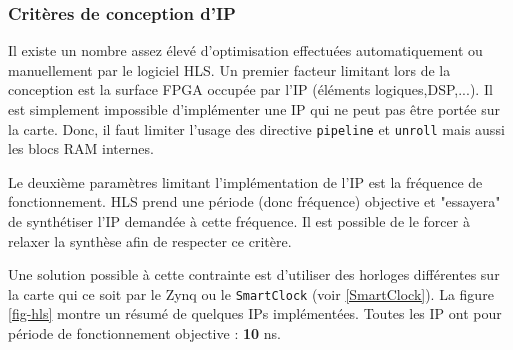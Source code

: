 \documentclass[12pt,a4paper]{article}
\begin{document}
\subsubsection{Critères de conception d'IP}
Il existe un nombre assez élevé d'optimisation effectuées automatiquement ou manuellement par le logiciel HLS. Un premier facteur limitant lors de la conception est la surface FPGA occupée par l'IP (éléments logiques,DSP,...). Il est simplement impossible d'implémenter une IP qui ne peut pas être portée sur la carte. Donc, il faut limiter l'usage des directive \texttt{pipeline} et \texttt{unroll} mais aussi les blocs RAM internes.

Le deuxième paramètres limitant l'implémentation de l'IP est la fréquence de fonctionnement. HLS prend une période (donc fréquence) objective et "essayera" de synthétiser l'IP demandée à cette fréquence. Il est possible de le forcer à relaxer la synthèse afin de respecter ce critère.

Une solution possible à cette contrainte est d'utiliser des horloges différentes sur la carte qui ce soit par le Zynq ou le \texttt{SmartClock} (voir \ref{SmartClock}). La figure \ref{fig-hls} montre un résumé de quelques IPs implémentées. Toutes les IP ont pour période de fonctionnement objective : \textbf{10} ns.
\end{document}
